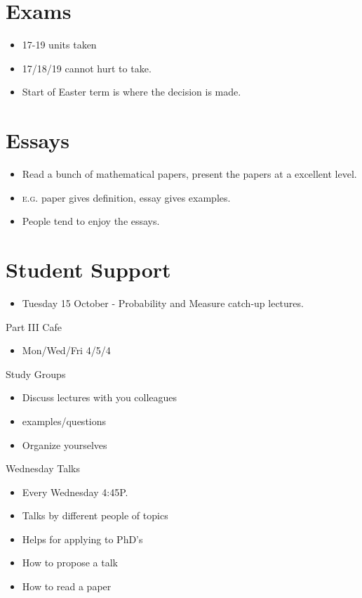 \section{Exams}
\label{sec:exams}

\begin{itemize}
\item 17-19 units taken
\item 17/18/19 cannot hurt to take.
\item Start of Easter term is where the decision is made.
\end{itemize}

\section{Essays}
\label{sec:essays}

\begin{itemize}
\item Read a bunch of mathematical papers, present the papers at a
  excellent level.
\item \textsc{e.g.} paper gives definition, essay gives examples.
\item People tend to enjoy the essays.
\end{itemize}

\section{Student Support}
\label{sec:student-support}

\begin{itemize}
\item Tuesday 15 October - Probability and Measure catch-up lectures.
\end{itemize}

Part III Cafe
\begin{itemize}
\item Mon/Wed/Fri 4/5/4
\end{itemize}

Study Groups

\begin{itemize}
\item Discuss lectures with you colleagues
\item examples/questions
\item Organize yourselves
\end{itemize}

Wednesday Talks

\begin{itemize}
\item Every Wednesday 4:45P.
\item Talks by different people of topics
\item Helps for applying to PhD's
\item How to propose a talk
\item How to read a paper
\end{itemize}

